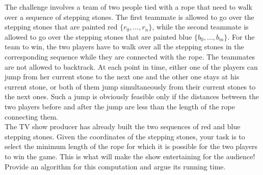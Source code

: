 \documentclass{article}
\begin{document}
\noindent The challenge involves a team of two people tied with a rope
that need to walk over a sequence of stepping stones. The first
teammate is allowed to go over the stepping stones that are painted
red $\{r_0, \ldots, r_n\}$, while the second teammate is allowed to go
over the stepping stones that are painted blue $\{b_0, \ldots,
b_m\}$. For the team to win, the two players have to walk over all the
stepping stones in the corresponding sequence while they are connected
with the rope. The teammates are not allowed to backtrack. At each
point in time, either one of the players can jump from her current
stone to the next one and the other one stays at his current stone, or
both of them jump simultaneously from their current stones to the next
ones. Such a jump is obviously feasible only if the distances between
the two players before and after the jump are less than the length of
the rope connecting them.\\

\noindent The TV show producer has already built the two sequences of
red and blue stepping stones. Given the coordinates of the stepping
stones, your task is to select the minimum length of the rope for
which it is possible for the two players to win the game. This is what
will make the show entertaining for the audience!\\

\noindent Provide an algorithm for this computation and argue its
running time.
\end{document}
